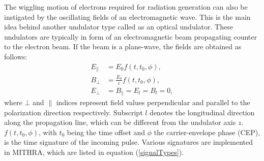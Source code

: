 The wiggling motion of electrons required for radiation generation can also be instigated by the oscillating fields of an electromagnetic wave.
%
This is the main idea behind another undulator type called as an optical undulator.
%
These undulators are typically in form of an electromagnetic beam propagating counter to the electron beam.
%
If the beam is a plane-wave, the fields are obtained as follows:
%
\begin{align}
\label{opticalUndulatorPW}
E_\parallel & = E_0 f(t,t_0,\phi) , \nonumber \\
B_\bot & = \frac{E_0}{c} f(t,t_0,\phi), \\
E_\bot & = B_\parallel = E_l = B_l = 0, \nonumber
\end{align}
%
where $\bot$ and $\parallel$ indices represent field values perpendicular and parallel to the polarization direction respectively.
%
Subscript $l$ denotes the longitudinal direction along the propagation line, which can be different from the undulator axis $z$.
%
$f(t,t_0,\phi)$, with $t_0$ being the time offset and $\phi$ the carrier-envelope phase (CEP), is the time signature of the incoming pulse.
%
Various signatures are implemented in MITHRA, which are listed in equation (\ref{signalTypes}).

